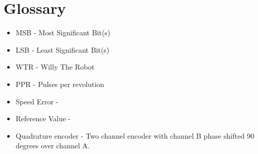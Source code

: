 \section{Glossary}
\begin{itemize}
\item \label{trm::MSB} MSB  - Most Significant Bit(s)
\item \label{trm::LSB} LSB  - Least Significant Bit(s)
\item \label{trm::WTR} WTR  - Willy The Robot
\item \label{trm::PPR} PPR - Pulses per revolution
\item \label{trm::speederror} Speed Error -  
\item \label{trm::refturn} Reference Value - 
\item \label{trm::quad} Quadrature encoder - Two channel encoder with channel B phase shifted 90 degrees over channel A.
\end{itemize}